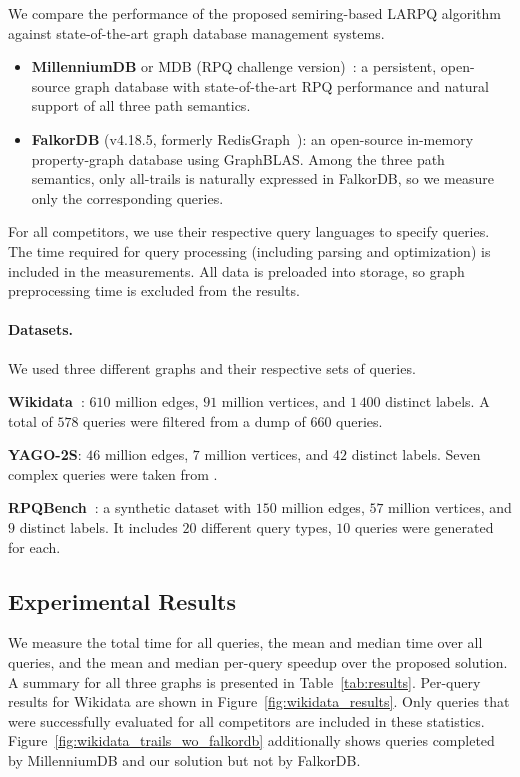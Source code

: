 We compare the performance of the proposed semiring-based LARPQ algorithm against state-of-the-art graph database management systems.
\begin{itemize}
    \item \textbf{MillenniumDB} or MDB (RPQ challenge version)~\cite{millenniumdb}: a persistent, open-source graph database with state-of-the-art RPQ performance and natural support of all three path semantics. 
    \item \textbf{FalkorDB} (v4.18.5, formerly RedisGraph~\cite{redisgraph}): an open-source in-memory property-graph database using GraphBLAS. Among the three path semantics, only all-trails is naturally expressed in FalkorDB, so we measure only the corresponding queries.
\end{itemize}

For all competitors, we use their respective query languages to specify queries.
The time required for query processing (including parsing and optimization) is included in the measurements.
All data is preloaded into storage, so graph preprocessing time is excluded from the results.

\paragraph{Datasets.}

We used three different graphs and their respective sets of queries.

\textbf{Wikidata~\cite{wikidata}}: $610$ million edges, $91$ million vertices, and $1\,400$ distinct labels. A total of $578$ queries were filtered from a dump of $660$ queries.

\textbf{YAGO-2S}: $46$ million edges, $7$ million vertices, and $42$ distinct labels. Seven complex queries were taken from \cite{yago-queries}.

\textbf{RPQBench~\cite{rpqbench}}: a synthetic dataset with $150$ million edges, $57$ million vertices, and $9$ distinct labels. It includes $20$ different query types, $10$ queries were generated for each.

\subsection{Experimental Results}

We measure the total time for all queries, the mean and median time over all queries, and the mean and median per-query speedup over the proposed solution.
A summary for all three graphs is presented in Table~\ref{tab:results}.
Per-query results for Wikidata are shown in Figure~\ref{fig:wikidata_results}. 
Only queries that were successfully evaluated for all competitors are included in these statistics.
Figure~\ref{fig:wikidata_trails_wo_falkordb} additionally shows queries completed by MillenniumDB and our solution but not by FalkorDB.

